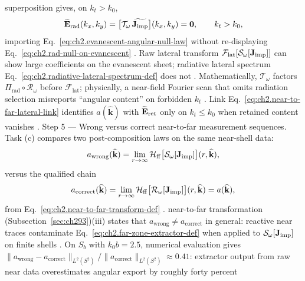 superposition gives, on \(k_t>k_0\),
\begin{equation}
\label{eq:ch2.ex-ev-lateral-null}
\widetilde{\mathbf{E}}_{\mathrm{rad}}(k_x,k_y)
=
\big[\mathcal{T}_\omega\,\widetilde{\mathbf{J}_{\mathrm{imp}}}\big](k_x,k_y)
=
\mathbf{0},
\qquad
k_t>k_0,
\end{equation}
importing Eq.~\eqref{eq:ch2.evanescent-angular-null-law} without re-displaying
Eq.~\eqref{eq:ch2.rad-null-on-evanescent} \cite{stratton1941}. Raw lateral transform
\(\mathcal{F}_{\mathrm{lat}}[\mathcal{S}_\omega[\mathbf{J}_{\mathrm{imp}}]]\) can show large coefficients on the
evanescent sheet; radiative lateral spectrum
Eq.~\eqref{eq:ch2.radiative-lateral-spectrum-def} does not \cite{stratton1941}. Mathematically,
\(\mathcal{T}_\omega\) factors \(\Pi_{\mathrm{rad}}\circ\mathcal{R}_\omega\) before
\(\mathcal{F}_{\mathrm{lat}}\); physically, a near-field Fourier scan that omits radiation selection
misreports ``angular content'' on forbidden \(k_t\) \cite{harrington2001}. Link
Eq.~\eqref{eq:ch2.near-to-far-lateral-link} identifies \(a(\widehat{\mathbf{k}})\) with
\(\widetilde{\mathbf{E}}_{\mathrm{ret}}\) only on \(k_t\le k_0\) when retained content vanishes
\cite{stratton1941}. Step 5 — Wrong versus correct near-to-far measurement sequences. Task (c) compares two post-composition laws on the same near-shell data:
\begin{equation}
\label{eq:ch2.ex-ev-wrong-measurement chain}
a_{\mathrm{wrong}}(\widehat{\mathbf{k}})
=
\lim_{r\to\infty}
\mathcal{H}_{\mathrm{ff}}\big[\mathcal{S}_\omega[\mathbf{J}_{\mathrm{imp}}]\big](r,\widehat{\mathbf{k}}),
\end{equation}
versus the qualified chain
\begin{equation}
\label{eq:ch2.ex-ev-correct-measurement chain}
a_{\mathrm{correct}}(\widehat{\mathbf{k}})
=
\lim_{r\to\infty}
\mathcal{H}_{\mathrm{ff}}\big[\mathcal{R}_\omega[\mathbf{J}_{\mathrm{imp}}]\big](r,\widehat{\mathbf{k}})
=
a(\widehat{\mathbf{k}}),
\end{equation}
from Eq.~\eqref{eq:ch2.near-to-far-transform-def} \cite{stratton1941}. near-to-far transformation (Subsection~\ref{sec:ch293})(iii) states that
\(a_{\mathrm{wrong}}\neq a_{\mathrm{correct}}\) in general: reactive near traces contaminate
Eq.~\eqref{eq:ch2.far-zone-extractor-def} when applied to \(\mathcal{S}_\omega[\mathbf{J}_{\mathrm{imp}}]\) on finite
shells \cite{stratton1941}. On \(S_b\) with \(k_0 b=2.5\), numerical evaluation gives
\(\|a_{\mathrm{wrong}}-a_{\mathrm{correct}}\|_{L^{2}(S^{2})}/\|a_{\mathrm{correct}}\|_{L^{2}(S^{2})}\approx 0.41\):
extractor output from raw near data overestimates angular export by roughly forty percent
